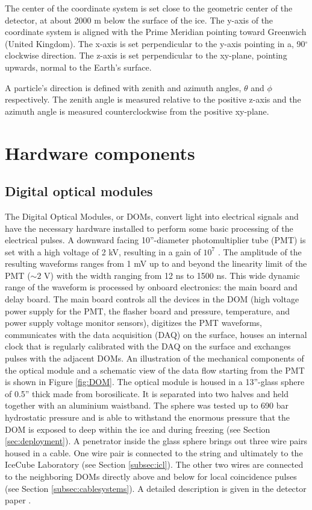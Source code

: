 \noindent The center of the coordinate system is set close to the geometric center of the detector, at about 2000 m below the surface of the ice. The y-axis of the coordinate system is aligned with the Prime Meridian pointing toward Greenwich (United Kingdom). The x-axis is set perpendicular to the y-axis pointing in a, 90$^\circ$ clockwise direction. The z-axis is set perpendicular to the xy-plane, pointing upwards, normal to the Earth's surface.

A particle's direction is defined with zenith and azimuth angles, $\theta$ and $\phi$ respectively. The zenith angle is measured relative to the positive z-axis and the azimuth angle is measured counterclockwise from the positive xy-plane.



\section{Hardware components}
\subsection{Digital optical modules}
\label{subsec:doms}
The Digital Optical Modules, or DOMs, convert light into electrical signals and have the necessary hardware installed to perform some basic processing of the electrical pulses. A downward facing 10''-diameter photomultiplier tube (PMT) is set with a high voltage of 2 kV, resulting in a gain of $10^7$ \cite{Aartsen:2016nxy}. The amplitude of the resulting waveforms ranges from 1 mV up to and beyond the linearity limit of the PMT ($\sim2$ V) with the width ranging from 12 ns to 1500 ns. This wide dynamic range of the waveform is processed by onboard electronics: the main board and delay board. The main board controls all the devices in the DOM (high voltage power supply for the PMT, the flasher board and pressure, temperature, and power supply voltage monitor sensors), digitizes the PMT waveforms, communicates with the data acquisition (DAQ) on the surface, houses an internal clock that is regularly calibrated with the DAQ on the surface and exchanges pulses with the adjacent DOMs.
An illustration of the mechanical components of the optical module and a schematic view of the data flow starting from the PMT is shown in Figure \ref{fig:DOM}. The optical module is housed in a 13''-glass sphere of 0.5'' thick made from borosilicate. It is separated into two halves and held together with an aluminium waistband. The sphere was tested up to 690 bar hydrostatic pressure and is able to withstand the enormous pressure that the DOM is exposed to deep within the ice and during freezing (see Section \ref{sec:deployment}). A penetrator inside the glass sphere brings out three wire pairs housed in a cable. One wire pair is connected to the string and ultimately to the IceCube Laboratory (see Section \ref{subsec:icl}). The other two wires are connected to the neighboring DOMs directly above and below for local coincidence pulses (see Section \ref{subsec:cablesystems}). A detailed description is given in the detector paper \cite{Aartsen:2016nxy}.


